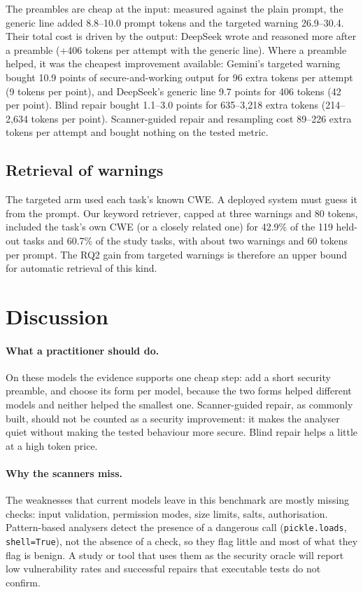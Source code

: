 \documentclass[10pt]{article}
\begin{document}
The preambles are cheap at the input: measured against the plain prompt, the generic line added 8.8--10.0 prompt
tokens and the targeted warning 26.9--30.4. Their total cost is driven by the output: DeepSeek wrote and reasoned
more after a preamble (+406 tokens per attempt with the generic line). Where a preamble helped, it was the cheapest
improvement available: Gemini's targeted warning bought 10.9 points of secure-and-working output for 96 extra tokens
per attempt (9 tokens per point), and DeepSeek's generic line 9.7 points for 406 tokens (42 per point). Blind repair
bought 1.1--3.0 points for 635--3{,}218 extra tokens (214--2{,}634 tokens per point). Scanner-guided repair and
resampling cost 89--226 extra tokens per attempt and bought nothing on the tested metric.

\subsection{Retrieval of warnings}\label{sec:enginea}
The targeted arm used each task's known CWE. A deployed system must guess it from the prompt. Our keyword
retriever, capped at three warnings and 80 tokens, included the task's own CWE (or a closely related one) for
42.9\% of the 119 held-out tasks and 60.7\% of the study tasks, with about two warnings and 60 tokens per prompt.
The RQ2 gain from targeted warnings is therefore an upper bound for automatic retrieval of this kind.

\section{Discussion}
\paragraph{What a practitioner should do.} On these models the evidence supports one cheap step: add a short
security preamble, and choose its form per model, because the two forms helped different models and neither helped
the smallest one. Scanner-guided repair, as commonly built, should not be counted as a security improvement: it
makes the analyser quiet without making the tested behaviour more secure. Blind repair helps a little at a high
token price.

\paragraph{Why the scanners miss.} The weaknesses that current models leave in this benchmark are mostly missing
checks: input validation, permission modes, size limits, salts, authorisation. Pattern-based analysers detect the
presence of a dangerous call (\texttt{pickle.loads}, \texttt{shell=True}), not the absence of a check, so they flag
little and most of what they flag is benign. A study or tool that uses them as the security oracle will report low
vulnerability rates and successful repairs that executable tests do not confirm.
\end{document}
